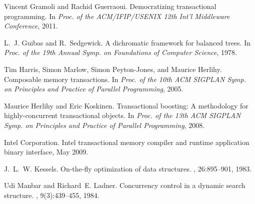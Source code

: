 \begin{thebibliography}{99}
{
Vincent Gramoli and Rachid Guerraoui.
\newblock Democratizing transactional programming.
\newblock In {\em Proc. of the ACM/IFIP/USENIX 12th Int'l Middleware
  Conference}, 2011.

L.~J. Guibas and R.~Sedgewick.
\newblock A dichromatic framework for balanced trees.
\newblock In {\em Proc. of the 19th Annual Symp. on Foundations of Computer
  Science}, 1978.


Tim Harris, Simon Marlow, Simon Peyton-Jones, and Maurice Herlihy.
\newblock Composable memory transactions.
\newblock In {\em Proc. of the 10th ACM SIGPLAN Symp. on Principles and
  Practice of Parallel Programming}, 2005.



Maurice Herlihy and Eric Koskinen.
\newblock Transactional boosting: A methodology for highly-concurrent
  transactional objects.
\newblock In {\em Proc. of the 13th ACM SIGPLAN Symp. on Principles and
  Practice of Parallel Programming}, 2008.



{Intel Corporation}.
\newblock Intel transactional memory compiler and runtime application binary
  interface, May 2009.

J.~L.~W. Kessels.
\newblock On-the-fly optimization of data structures.
, 26:895--901, 1983.



Udi Manbar and Richard~E. Ladner.
\newblock Concurrency control in a dynamic search structure.
, 9(3):439--455, 1984.


}
\end{thebibliography}
